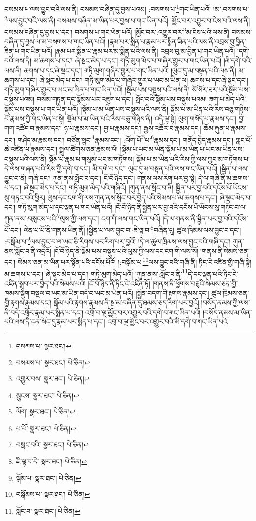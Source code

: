 བསམས་པ་ལས་བྱུང་བའི་ལས་ནི། བསམས་བཞིན་དུ་བྱས་པའམ། :བསགས་པ་\footnote{བསམས་པ་  སྣར་ཐང་། }གང་ཡིན་པའོ། །མ་:བསགས་པ་\footnote{བསམས་པ་  སྣར་ཐང་།  པེ་ཅིན། }ལས་བྱུང་བའི་ལས་ནི། བསམས་བཞིན་མ་ཡིན་པར་བྱས་པ་གང་ཡིན་པའོ། །མྱོང་བར་འགྱུར་བ་ངེས་པའི་ལས་ནི། བསམས་བཞིན་དུ་བྱས་པ་དང་། བསགས་པ་གང་ཡིན་པའོ། །མྱོང་བར་:འགྱུར་བར་\footnote{འགྱུར་བས་  སྣར་ཐང་།  པེ་ཅིན། }མ་ངེས་པའི་ལས་ནི། བསམས་བཞིན་དུ་བྱས་ལ་མ་བསགས་པ་གང་ཡིན་པའོ། །རྣམ་པར་སྨིན་པ་རྣམ་པར་སྨིན་ཟིན་པའི་ལས་ནི་འབྲས་བུ་བྱིན་ཟིན་པ་གང་ཡིན་པའོ། །རྣམ་པར་སྨིན་པ་རྣམ་པར་མ་སྨིན་པའི་ལས་ནི། འབྲས་བུ་མ་བྱིན་པ་གང་ཡིན་པའོ། །དགེ་བའི་ལས་ནི། མ་ཆགས་པ་དང་། ཞེ་སྡང་མེད་པ་དང་། གཏི་མུག་མེད་པ་གཞིར་གྱུར་པ་གང་ཡིན་པའོ། །མི་དགེ་བའི་ལས་ནི། ཆགས་པ་དང་ཞེ་སྡང་དང་། གཏི་མུག་གཞིར་གྱུར་པ་གང་ཡིན་པའོ། །ལུང་དུ་མ་བསྟན་པའི་ལས་ནི། མ་ཆགས་པ་དང་། ཞེ་སྡང་མེད་པ་དང་། གཏི་མུག་མེད་པ་གཞིར་གྱུར་པ་ཡང་མ་ཡིན་ལ། ཆགས་པ་དང་ཞེ་སྡང་དང་། གཏི་མུག་གཞིར་གྱུར་པ་ཡང་མ་ཡིན་པ་གང་ཡིན་པའོ། །སྡོམ་པས་བསྡུས་པའི་ལས་ནི། སོ་སོར་ཐར་པའི་སྡོམ་པས་བསྡུས་པའམ། བསམ་གཏན་དང་སྙོམས་པར་འཇུག་པ་དང་། སྤོང་བའི་སྡོམ་པས་བསྡུས་པའམ། ཟག་པ་མེད་པའི་སྡོམ་པས་བསྡུས་པ་གང་ཡིན་པའོ། །སྡོམ་པ་མ་ཡིན་པས་བསྡུས་པའི་ལས་ནི། སྡོམ་པ་མ་ཡིན་པའི་རིས་བཅུ་གཉིས་པོ་རྣམས་ཀྱི་གང་ཡིན་པ་སྟེ། སྡོམ་པ་མ་ཡིན་པའི་རིས་བཅུ་གཉིས་ནི། འདི་ལྟ་སྟེ། ལུག་གསོད་པ་རྣམས་དང་། བྱ་གག་འཚོང་བ་རྣམས་དང་། ཉ་པ་རྣམས་དང་། བྱ་པ་རྣམས་དང་། རྒྱས་འཆོར་བ་རྣམས་དང་། ཆོམ་རྐུན་པ་རྣམས་དང་། གཤེད་མ་རྣམས་དང་། བཙོན་སྲུང་\footnote{སྲུངས་  སྣར་ཐང་།  པེ་ཅིན། }རྣམས་དང་། :ལོག་པོ་\footnote{ལོག་  སྣར་ཐང་།  པེ་ཅིན། }པ་\footnote{པ་པོ་  སྣར་ཐང་།  པེ་ཅིན། }རྣམས་དང་། གནོད་བྱེད་རྣམས་དང་། གླང་པོ་ཆེ་འཛིན་པ་རྣམས་དང་། སྤྲུལ་ཚོགས་ཅན་རྣམས་སོ། །སྡོམ་པ་ཡང་མ་ཡིན་སྡོམ་པ་མ་ཡིན་པ་ཡང་མ་ཡིན་པས་བསྡུས་པའི་ལས་ནི། སྡོམ་པ་རྣམ་པ་གསུམ་ཡང་མ་གཏོགས། སྡོམ་པ་མ་ཡིན་པའི་རིས་ཀྱི་ལས་ཀྱང་མ་གཏོགས་པ། དེ་ལས་གཞན་པའི་རིས་ཀྱི་དགེ་བ་དང་། མི་དགེ་བ་དང་། ལུང་དུ་མ་བསྟན་པའི་ལས་གང་ཡིན་པའོ། །སྦྱིན་པ་ལས་བྱུང་བ་ནི། གཞི་དང་། ཀུན་ནས་སློང་བ་དང་། ངོ་བོ་ཉིད་དང་། གནས་ལས་རིག་པར་བྱ་སྟེ། དེ་ལ་གཞི་ནི་མ་ཆགས་པ་དང་། ཞེ་སྡང་མེད་པ་དང་། གཏི་མུག་མེད་པའི་གཞིའོ། །ཀུན་ནས་སློང་བ་ནི། སྦྱིན་པར་བྱ་བའི་དངོས་པོ་ཡོངས་སུ་གཏང་བའི་ཕྱིར། ལུས་དང་ངག་གི་ལས་ཀུན་ནས་སློང་བར་བྱེད་པའི་སེམས་པ་མ་ཆགས་པ་དང་། ཞེ་སྡང་མེད་པ་དང་། གཏི་མུག་མེད་པ་དང་ལྡན་པ་གང་ཡིན་པའོ། །ངོ་བོ་ཉིད་ནི་སྦྱིན་པར་བྱ་བའི་དངོས་པོ་ཡོངས་སུ་གཏོང་བ་ལ་ཀུན་ནས་:བསླངས་པའི་\footnote{བསླང་བའི་  སྣར་ཐང་།  པེ་ཅིན། }ལུས་ཀྱི་ལས་དང་། ངག་གི་ལས་གང་ཡིན་པའོ། །དེ་ལ་གནས་ནི་སྦྱིན་པར་བྱ་བའི་དངོས་པོ་དང་། ལེན་པ་པོ་ནི་གནས་ཡིན་ནོ། །སྦྱིན་པ་ལས་བྱུང་བ་:ཇི་ལྟ་བ་\footnote{ཇི་ལྟ་བ་དེ་  སྣར་ཐང་།  པེ་ཅིན། }བཞིན་དུ། ཚུལ་ཁྲིམས་ལས་བྱུང་བ་དང་། :བསྒོམ་པ་\footnote{སྒོམ་པ་  སྣར་ཐང་།  པེ་ཅིན། }ལས་བྱུང་བ་ལ་ཡང་ཅི་རིགས་པར་རིག་པར་བྱའོ། །དེ་ལ་ཚུལ་ཁྲིམས་ལས་བྱུང་བའི་གཞི་དང་། ཀུན་ནས་སློང་བ་ནི་འདྲའོ། །ངོ་བོ་ཉིད་ནི་སྡོམ་པས་བསྡུས་པའི་ལུས་ཀྱི་ལས་དང་ངག་གི་ལས་སོ། །གནས་ནི་སེམས་ཅན་དང་། སེམས་ཅན་མ་ཡིན་པར་སྟོན་པའི་དངོས་པོའོ། །:བསྒོམ་པ་\footnote{བསྒོམས་པ་  སྣར་ཐང་།  པེ་ཅིན། }ལས་བྱུང་བའི་གཞི་ནི། ཏིང་ངེ་འཛིན་གྱི་གཞི་སྟེ། མ་ཆགས་པ་དང་། ཞེ་སྡང་མེད་པ་དང་། གཏི་མུག་མེད་པའོ། །ཀུན་ནས་:སློང་བ་ནི་\footnote{སློང་བ་  སྣར་ཐང་།  པེ་ཅིན། }དེ་དང་ལྡན་པའི་ཏིང་ངེ་འཛིན་སྒྲུབ་པར་བྱེད་པའི་སེམས་པའོ། །ངོ་བོ་ཉིད་ནི་ཏིང་ངེ་འཛིན་ཏོ། །གནས་ནི་ཕྱོགས་བཅུའི་སེམས་ཅན་གྱི་ཁམས་སྡུག་བསྔལ་བ་ཡང་མ་ཡིན་བདེ་བ་ཡང་མ་ཡིན་པའོ། །སྦྱིན་བདག་གི་རྟགས་རྣམས་དང་། ཚུལ་ཁྲིམས་ཅན་གྱི་རྟགས་རྣམས་དང་། སྒོམ་པའི་རྟགས་རྣམས་ནི་སྔ་མ་བཞིན་དུ་ཐམས་ཅད་རིག་པར་བྱའོ། །བསོད་ནམས་ཀྱི་ལས་ནི་བདེ་འགྲོར་རྣམ་པར་སྨིན་པ་དང་། འགྲོ་བ་ལྔ་མྱོང་བར་འགྱུར་བའི་དགེ་བ་གང་ཡིན་པའོ། །བསོད་ནམས་མ་ཡིན་པའི་ལས་ནི་ངན་སོང་དུ་རྣམ་པར་སྨིན་པ་དང་། འགྲོ་བ་ལྔ་མྱོང་བར་འགྱུར་བའི་མི་དགེ་བ་གང་ཡིན་པའོ། 